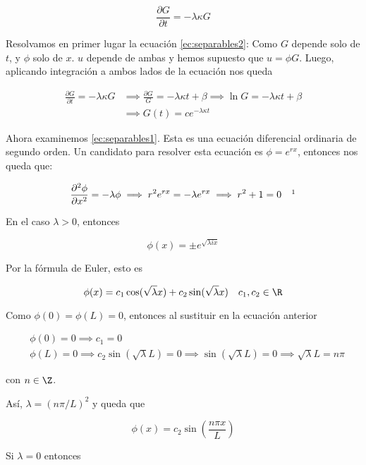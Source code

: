 \begin{equation}\label{ec:separables2}
    \displaystyle\frac{\partial G}{\partial t} = -\lambda \kappa G
\end{equation}

Resolvamos en primer lugar la ecuación \ref{ec:separables2}: Como $G$ depende solo de $t$, y $\phi$ solo de $x$. $u$ depende de ambas y hemos supuesto que $u = \phi G$. Luego, aplicando integración a ambos lados de la ecuación nos queda

\[
    \begin{split}
        \frac{\partial G}{\partial t} = -\lambda \kappa G &\implies \frac{\partial G}{G} = - \lambda \kappa t + \beta \implies \ln G = -\lambda \kappa t + \beta \\
        &\implies G(t) = c e^{-\lambda \kappa t}
    \end{split}
\]

Ahora examinemos \ref{ec:separables1}. Esta es una ecuación diferencial ordinaria de segundo orden. Un candidato para resolver esta ecuación es $\phi = e^{rx}$, entonces nos queda que:

\[
    \frac{\partial^2 \phi}{\partial x^2} = -\lambda \phi \implies r^2e^{rx} = -\lambda e^{rx} \implies r^2 + 1 = 0 \quad \footnotemark
\]

En el caso $\lambda > 0$, entonces

\[
    \phi(x) = \pm e^{\sqrt{\lambda ix}}
\]

Por la fórmula de Euler, esto es

\[
    \phi(x) = c_1 \cos(\sqrt{\lambda} x) + c_2 \sin(\sqrt{\lambda} x) \quad c_1, c_2 \in \R
\]

Como $\phi(0) = \phi(L) = 0$, entonces al sustituir en la ecuación anterior

\[
    \begin{split}
        &\phi(0) = 0 \implies c_1 = 0 \\
        &\phi(L) = 0 \implies c_2\sin(\sqrt{\lambda} L) = 0 \implies \sin(\sqrt{\lambda} L) = 0 \implies \sqrt{\lambda} L = n\pi
    \end{split}
\]

\noindent
con $n \in \Z$.

Así, $\lambda = (n\pi/L)^2$ y queda que

\[
    \displaystyle\phi(x) = c_2\sin\left( \frac{n \pi x}{L} \right)
\]

Si $\lambda = 0$ entonces

